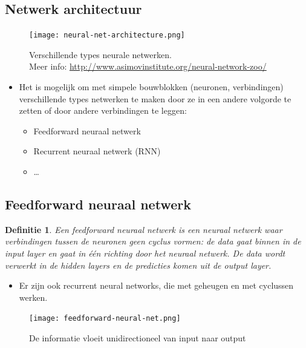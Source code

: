 \documentclass{article}
\newtheorem{theorem}{Definitie}[section]
\begin{document}
\subsection{Netwerk architectuur}

\begin{figure}[H]
    \centering
    \texttt{[image: neural-net-architecture.png]}
    \caption{Verschillende types neurale netwerken.\\ Meer info: \url{http://www.asimovinstitute.org/neural-network-zoo/}}
\end{figure}

\begin{itemize}
    \item Het is mogelijk om met simpele bouwblokken (neuronen, verbindingen) verschillende types netwerken te maken door ze in een andere volgorde te zetten of door andere verbindingen te leggen:
    \begin{itemize}
        \item Feedforward neuraal netwerk 
        \item Recurrent neuraal netwerk (RNN) 
        \item \dots
    \end{itemize}
\end{itemize}

\subsection{Feedforward neuraal netwerk}

\begin{theorem}
    Een feedforward neuraal netwerk is een neuraal netwerk waar verbindingen tussen de 
    neuronen geen cyclus vormen: de data gaat binnen in de input layer en gaat in één richting 
    door het neuraal netwerk. De data wordt verwerkt in de hidden layers en de predicties
    komen uit de output layer.
\end{theorem}

\begin{itemize}
    \item Er zijn ook recurrent neural networks, die met geheugen en met cyclussen werken.
\end{itemize}

\begin{figure}[H]
    \centering
    \texttt{[image: feedforward-neural-net.png]}
    \caption{De informatie vloeit unidirectioneel van input naar output}
\end{figure}
\end{document}
